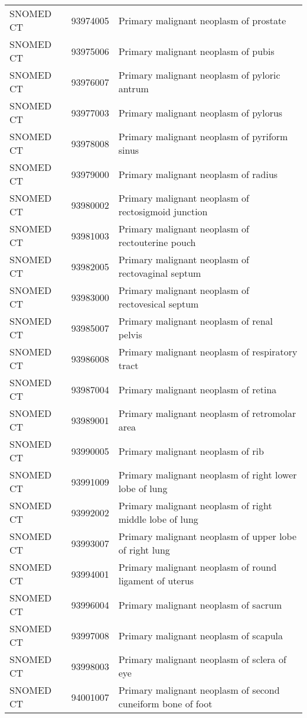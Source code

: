 \begin{longtable}{p{}p{}p{}}
  SNOMED CT & 93974005 & Primary malignant neoplasm of prostate \\ 
  SNOMED CT & 93975006 & Primary malignant neoplasm of pubis \\ 
  SNOMED CT & 93976007 & Primary malignant neoplasm of pyloric antrum \\ 
  SNOMED CT & 93977003 & Primary malignant neoplasm of pylorus \\ 
  SNOMED CT & 93978008 & Primary malignant neoplasm of pyriform sinus \\ 
  SNOMED CT & 93979000 & Primary malignant neoplasm of radius \\ 
  SNOMED CT & 93980002 & Primary malignant neoplasm of rectosigmoid junction \\ 
  SNOMED CT & 93981003 & Primary malignant neoplasm of rectouterine pouch \\ 
  SNOMED CT & 93982005 & Primary malignant neoplasm of rectovaginal septum \\ 
  SNOMED CT & 93983000 & Primary malignant neoplasm of rectovesical septum \\ 
  SNOMED CT & 93985007 & Primary malignant neoplasm of renal pelvis \\ 
  SNOMED CT & 93986008 & Primary malignant neoplasm of respiratory tract \\ 
  SNOMED CT & 93987004 & Primary malignant neoplasm of retina \\ 
  SNOMED CT & 93989001 & Primary malignant neoplasm of retromolar area \\ 
  SNOMED CT & 93990005 & Primary malignant neoplasm of rib \\ 
  SNOMED CT & 93991009 & Primary malignant neoplasm of right lower lobe of lung \\ 
  SNOMED CT & 93992002 & Primary malignant neoplasm of right middle lobe of lung \\ 
  SNOMED CT & 93993007 & Primary malignant neoplasm of upper lobe of right lung \\ 
  SNOMED CT & 93994001 & Primary malignant neoplasm of round ligament of uterus \\ 
  SNOMED CT & 93996004 & Primary malignant neoplasm of sacrum \\ 
  SNOMED CT & 93997008 & Primary malignant neoplasm of scapula \\ 
  SNOMED CT & 93998003 & Primary malignant neoplasm of sclera of eye \\ 
  SNOMED CT & 94001007 & Primary malignant neoplasm of second cuneiform bone of foot \\ 

\end{longtable}
